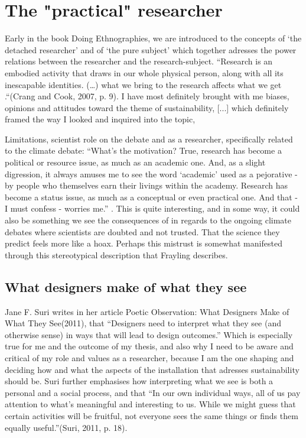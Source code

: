 \section{The "practical" researcher}
Early in the book Doing Ethnographies, we are introduced to the concepts of ‘the detached researcher’ and of ‘the pure subject’ which together adresses the power relations between the researcher and the research-subject. “Research is an embodied activity that draws in our whole physical person, along with all its inescapable identities. (…) what we bring to the research affects what we get .“(Crang and Cook, 2007, p. 9). I have most definitely brought with me biases, opinions and attitudes toward the theme of sustainability, [...] which definitely framed the way I looked and inquired into the topic,

Limitations, scientist role on the debate and as a researcher, specifically related to the climate debate:
“What’s the motivation? True, research has become a political or resource issue, as much as an academic one. And, as a slight digression, it always amuses me to see the word ‘academic’ used as a pejorative - by people who themselves earn their livings within the academy. Research has become a status issue, as much as a conceptual or even practical one. And that - I must confess - worries me.” \autocite[p. 5]{frayling_1994}. This is quite interesting, and in some way, it could also be something we see the consequences of in regards to the ongoing climate debates where scientists are doubted and not trusted. That the science they predict feels more like a hoax. Perhaps this mistrust is somewhat manifested through this stereotypical description that Frayling describes.

\subsection{What designers make of what they see}
Jane F. Suri writes in her article Poetic Observation: What Designers Make of What They See(2011), that “Designers need to interpret what they see (and otherwise sense) in ways that will lead to design outcomes.” Which is especially true for me and the outcome of my thesis, and also why I need to be aware and critical of my role and values as a researcher, because  I am the one shaping and deciding how and what the aspects of the installation that adresses sustainability should be. Suri further emphasises how interpreting what we see is both a personal and a social process, and that “In our own individual ways, all of us pay attention to what’s meaningful and interesting to us. While we might guess that certain activities will be fruitful, not everyone sees the same things or finds them equally useful.”(Suri, 2011, p. 18).

